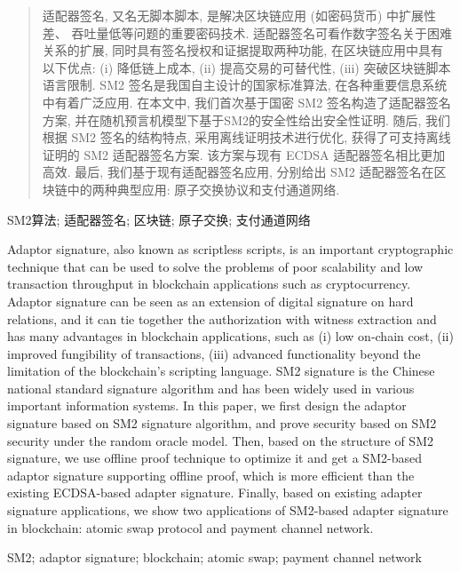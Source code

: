 \documentclass[review]{jcr}
\begin{document}
\begin{frontmatter}


  \begin{abstract}
  适配器签名, 又名无脚本脚本, 是解决区块链应用 (如密码货币) 中扩展性差、 吞吐量低等问题的重要密码技术. 适配器签名可看作数字签名关于困难关系的扩展, 同时具有签名授权和证据提取两种功能, 在区块链应用中具有以下优点: (i) 降低链上成本, (ii) 提高交易的可替代性, (iii) 突破区块链脚本语言限制. SM2 签名是我国自主设计的国家标准算法, 在各种重要信息系统中有着广泛应用. 在本文中, 我们首次基于国密 SM2 签名构造了适配器签名方案, 并在随机预言机模型下基于SM2的安全性给出安全性证明. 随后, 我们根据 SM2 签名的结构特点, 采用离线证明技术进行优化, 获得了可支持离线证明的 SM2 适配器签名方案. 该方案与现有 ECDSA 适配器签名相比更加高效. 最后, 我们基于现有适配器签名应用, 分别给出 SM2 适配器签名在区块链中的两种典型应用: 原子交换协议和支付通道网络. 
  \end{abstract}

  \begin{keywords}
    SM2算法; 适配器签名; 区块链; 原子交换; 支付通道网络
  \end{keywords}

  \begin{eabstract}
   Adaptor signature, also known as scriptless scripts, is an important cryptographic technique that can be used to solve the problems of poor scalability and low transaction throughput in blockchain applications such as cryptocurrency. Adaptor signature can be seen as an extension of digital signature on hard relations, and it can tie together the authorization with witness extraction and has many advantages in blockchain applications, such as (i) low on-chain cost, (ii) improved fungibility of transactions, (iii) advanced functionality beyond the limitation of the blockchain's scripting language. SM2 signature is the Chinese national standard signature algorithm and has been widely used in various important information systems. In this paper, we first design the adaptor signature based on SM2 signature algorithm, and prove security based on SM2 security under the random oracle model. Then, based on the structure of SM2 signature, we use offline proof technique to optimize it and get a SM2-based adaptor signature supporting offline proof, which is more efficient than the existing ECDSA-based adapter signature. Finally, based on existing adapter signature applications, we show two applications of SM2-based adapter signature in blockchain: atomic swap protocol and payment channel network.

  \end{eabstract}

  \begin{ekeywords}
    SM2; adaptor signature; blockchain; atomic swap; payment channel network
  \end{ekeywords}
\end{frontmatter}
\end{document}
